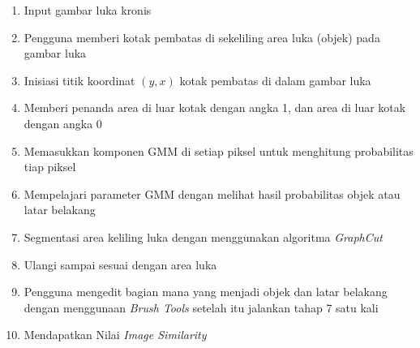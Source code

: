 \begin{enumerate}
    \item{Input gambar luka kronis}
    \item{Pengguna memberi kotak pembatas di sekeliling area luka (objek) pada gambar luka}
    \item{Inisiasi titik koordinat \((y,x)\) kotak pembatas di dalam gambar luka}
    \item{Memberi penanda area di luar kotak dengan angka 1, dan area di luar kotak
    dengan angka 0}
    \item{Memasukkan komponen GMM di setiap piksel untuk menghitung probabilitas 
    tiap piksel }
    \item{Mempelajari parameter GMM dengan melihat hasil probabilitas objek atau latar belakang}
    \item{Segmentasi area keliling luka dengan menggunakan algoritma \emph{GraphCut}}
    \item{Ulangi sampai sesuai dengan area luka}
    \item{Pengguna mengedit bagian mana yang menjadi objek dan latar belakang 
    dengan menggunaan \emph{Brush Tools} setelah itu jalankan tahap 7 satu kali  }
    \item{Mendapatkan Nilai \emph{Image Similarity}}
  \end{enumerate}